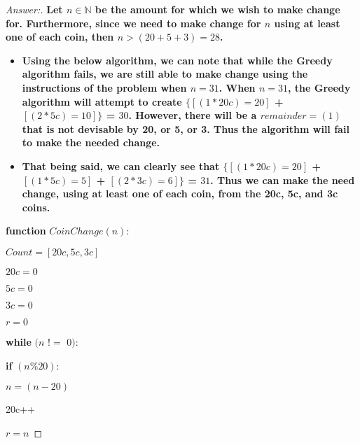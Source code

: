 \documentclass[11pt]{article}
\theoremstyle{definition}
\theoremstyle{definition}
\theoremstyle{definition}
\begin{document}


\begin{proof}[Answer:]
\item \textbf{Let $n \in \mathbb{N}$  be the amount for which we wish to make change for. Furthermore, since we need to make change for $n$ using at least one of each coin, then $n > (20 + 5 + 3) = 28$.}
\begin{itemize}
\item \textbf{Using the below algorithm, we can note that while the Greedy algorithm fails, we are still able to make change using the instructions of the problem when $n = 31$. When \color{red} $n = 31$, \color{black} the Greedy algorithm will attempt to create $\{[(1 * 20c) = 20]$ + $[(2 * 5c) = 10]\}$ = $30$. However, there will be a $remainder = (1)$ that is not devisable by 20, or 5, or 3. Thus the algorithm will fail to make the needed change.} 
\item \textbf{That being said, we can clearly see that $\{[(1 * 20c) = 20]$ + $[(1 * 5c) = 5]$ + $[(2 * 3c) = 6]\}$ = $31$. Thus we can make the need change, using at least one of each coin, from the 20c, 5c, and 3c coins.}
\end{itemize}

\item \textbf{function} $CoinChange(n):$										
	\item	\hspace*{10mm} $Count = [20c, 5c, 3c]$
	\item	\hspace*{10mm} $20c = 0$
	\item	\hspace*{10mm} $5c = 0$
	\item	\hspace*{10mm} $3c = 0$
	\item	\hspace*{10mm} $r = 0$

	\item	\hspace*{10mm} \textbf{while} $(n$ $!=$ $0):$
	
		\item	\hspace*{20mm} \textbf{if} $(n \% 20):$
			\item	\hspace*{30mm} $n = (n-20)$
			\item	\hspace*{30mm} 20c++
			\item	\hspace*{30mm} $r = n$
			

\end{proof}
\end{document}
